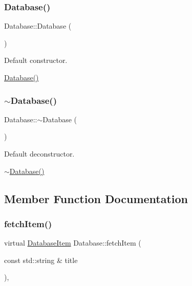 \subsubsection{\texorpdfstring{Database()}{Database()}}
{\footnotesize\ttfamily Database\+::\+Database (\begin{DoxyParamCaption}{ }\end{DoxyParamCaption})\hspace{0.3cm}{\ttfamily [default]}}



Default constructor. 

\hyperlink{classDatabase_aa57fbada3001c2db58a0ca6c7071bd18}{Database()} \mbox{\label{classDatabase_a341cd0fe8c615e829e3a22b74c208bb5}} 
\subsubsection{\texorpdfstring{$\sim$\+Database()}{~Database()}}
{\footnotesize\ttfamily Database\+::$\sim$\+Database (\begin{DoxyParamCaption}{ }\end{DoxyParamCaption})\hspace{0.3cm}{\ttfamily [default]}}



Default deconstructor. 

\hyperlink{classDatabase_a341cd0fe8c615e829e3a22b74c208bb5}{$\sim$\+Database()} 

\subsection{Member Function Documentation}
\mbox{\label{classDatabase_a40254eec69c7d7cc15da24a9f0b072b3}} 
\subsubsection{\texorpdfstring{fetch\+Item()}{fetchItem()}}
{\footnotesize\ttfamily virtual \hyperlink{classDatabaseItem}{Database\+Item} Database\+::fetch\+Item (\begin{DoxyParamCaption}\item[{const std\+::string \&}]{title }\end{DoxyParamCaption})\hspace{0.3cm}{\ttfamily [inline]}, {\ttfamily [virtual]}}



